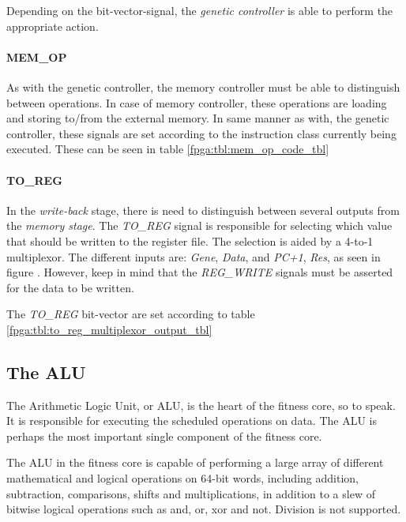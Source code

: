 

Depending on the bit-vector-signal, the \emph{genetic controller} is able to perform the appropriate action. 


\paragraph{MEM\_OP}
As with the genetic controller, the memory controller must be able to distinguish between operations. In case of memory controller, these operations are loading and storing to/from the external memory. In same manner as with, the genetic controller, these signals are set according to the instruction class currently being executed. These can be seen in table \ref{fpga:tbl:mem_op_code_tbl}




\paragraph{TO\_REG}
In the \emph{write-back} stage, there is need to distinguish between several outputs from the \emph{memory stage}. The \emph{TO\_REG} signal is responsible for selecting which value that should be written to the register file. The selection is aided by a 4-to-1 multiplexor. The different inputs are: \emph{Gene}, \emph{Data}, and \emph{PC+1}, \emph{Res}, as seen in figure . However, keep in mind that the \emph{REG\_WRITE} signals must be asserted for the data to be written. 

The \emph{TO\_REG} bit-vector are set according to table \ref{fpga:tbl:to_reg_multiplexor_output_tbl}




\subsection{The ALU}

The Arithmetic Logic Unit, or ALU, is the heart of the fitness core, so to speak.
It is responsible for executing the scheduled operations on data.
The ALU is perhaps the most important single component of the fitness core.

The ALU in the fitness core is capable of performing a large array of different mathematical and logical operations on 64-bit words, including addition, subtraction, comparisons, shifts and multiplications, in addition to a slew of bitwise logical operations such as and, or, xor and not.
Division is not supported.

